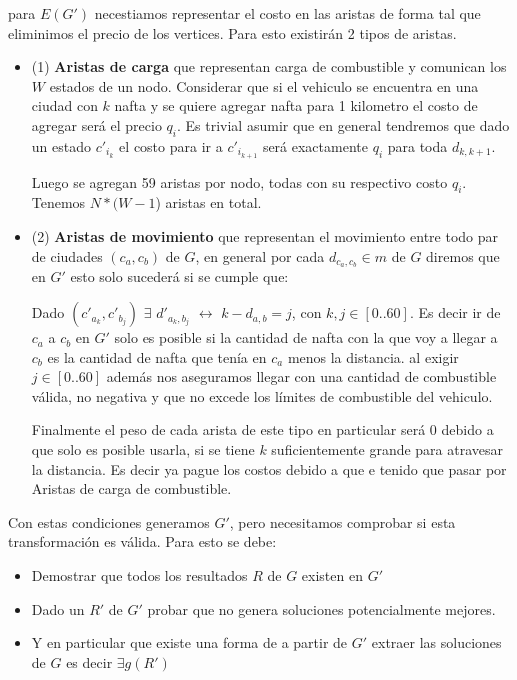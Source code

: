 \documentclass[12pt]{article}
\begin{document}
para $E(G')$ necestiamos representar el costo en las aristas de forma tal que eliminimos el precio de los vertices. Para esto existirán 2 tipos de aristas.

\begin{itemize}
	\item (1) \textbf{Aristas de carga} que representan carga de combustible y comunican los $W$ estados de un nodo. Considerar que si el vehiculo se encuentra en una ciudad con $k$ nafta y se quiere agregar nafta para 1 kilometro el costo de agregar será el precio $q_i$. Es trivial asumir que en general tendremos que dado un estado $c'_{i_k}$ el costo para ir a $c'_{i_{k+1}}$ será exactamente $q_i$ para toda $d_{k,k+1}$.
	
	Luego se agregan 59 aristas por nodo, todas con su respectivo costo $q_i$. Tenemos $N * (W - 1$) aristas en total.
\end{itemize}



\begin{itemize}
	\item (2) \textbf{Aristas de movimiento} que representan el movimiento entre todo par de ciudades $(c_a, c_b)$ de $G$, en general por cada $d_{c_a,c_b} \in m$ de $G$ diremos que en $G'$ esto solo sucederá si se cumple que:
	
	Dado $(c'_{a_k}, c'_{b_j})$ $\exists$ $d'_{a_k,b_j}$ $\leftrightarrow$  $k - d_{a,b} = j$, con $k,j \in [0..60]$. Es decir ir de $c_a$ a $c_b$ en $G'$ solo es posible si la cantidad de nafta con la que voy a llegar a $c_b$ es la cantidad de nafta que tenía en $c_a$ menos la distancia. al exigir $j \in [0..60]$ además nos aseguramos llegar con una cantidad de combustible válida, no negativa y que no excede los límites de combustible del vehiculo.
	 
	Finalmente el peso de cada arista de este tipo en particular será $0$ debido a que solo es posible usarla, si se tiene $k$ suficientemente grande para atravesar la distancia. Es decir ya pague los costos debido a que e tenido que pasar por Aristas de carga de combustible.
\end{itemize}

Con estas condiciones generamos $G'$, pero necesitamos comprobar si esta transformación es válida. Para esto se debe:

\begin{itemize}
 \item Demostrar que todos los resultados $R$ de $G$ existen en $G'$  
 \item Dado un $R'$ de $G'$ probar que no genera soluciones potencialmente mejores.
 \item Y en particular que existe una forma de a partir de $G'$ extraer las soluciones de $G$ es decir $\exists g(R')$
\end{itemize}
\end{document}
